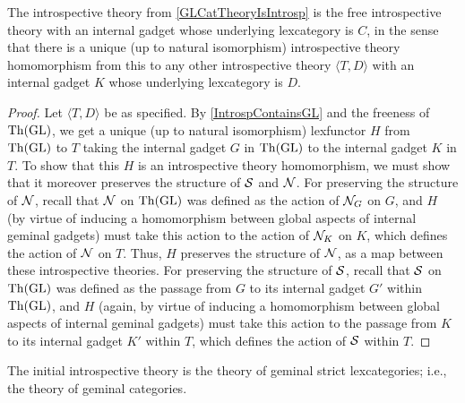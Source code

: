 \begin{theorem}
The introspective theory from \cref{GLCatTheoryIsIntrosp} is the free introspective theory with an internal gadget whose underlying lexcategory is $C$, in the sense that there is a unique (up to natural isomorphism) introspective theory homomorphism from this to any other introspective theory $\langle T, D \rangle$ with an internal gadget $K$ whose underlying lexcategory is $D$.
\end{theorem}
\begin{proof}
Let $\langle T, D \rangle$ be as specified. By \cref{IntrospContainsGL} and the freeness of $\mathrm{Th}(\mathrm{GL})$, we get a unique (up to natural isomorphism) lexfunctor $H$ from $\mathrm{Th}(\mathrm{GL})$ to $T$ taking the internal gadget $G$ in $\mathrm{Th}(\mathrm{GL})$ to the internal gadget $K$ in $T$. To show that this $H$ is an introspective theory homomorphism, we must show that it moreover preserves the structure of $\mathcal{S}$ and $\mathcal{N}$. For preserving the structure of $\mathcal{N}$, recall that $\mathcal{N}$ on $\mathrm{Th}(\mathrm{GL})$ was defined as the action of $\mathcal{N}_{G}$ on $G$, and $H$ (by virtue of inducing a homomorphism between global aspects of internal geminal gadgets) must take this action to the action of $\mathcal{N}_{K}$ on $K$, which defines the action of $\mathcal{N}$ on $T$. Thus, $H$ preserves the structure of $\mathcal{N}$, as a map between these introspective theories. For preserving the structure of $\mathcal{S}$, recall that $\mathcal{S}$ on $\mathrm{Th}(\mathrm{GL})$ was defined as the passage from $G$ to its internal gadget $G'$ within $\mathrm{Th}(\mathrm{GL})$, and $H$ (again, by virtue of inducing a homomorphism between global aspects of internal geminal gadgets) must take this action to the passage from $K$ to its internal gadget $K'$ within $T$, which defines the action of $\mathcal{S}$ within $T$.
\end{proof}
\begin{corollary}
The initial introspective theory is the theory of geminal strict lexcategories; i.e., the theory of geminal categories.
\end{corollary}


